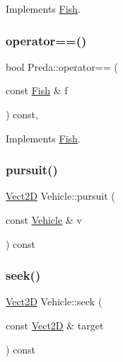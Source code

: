 Implements \hyperlink{classFish_aa739aa5c06ff6054b051047bccd3bf6f_aa739aa5c06ff6054b051047bccd3bf6f}{Fish}.

\mbox{\label{classPreda_a38ba49e7ab329e8ebbf23f242d3dd084_a38ba49e7ab329e8ebbf23f242d3dd084}} 
\subsubsection{\texorpdfstring{operator==()}{operator==()}}
{\footnotesize\ttfamily bool Preda\+::operator== (\begin{DoxyParamCaption}\item[{const \hyperlink{classFish}{Fish} \&}]{f }\end{DoxyParamCaption}) const\hspace{0.3cm}{\ttfamily [override]}, {\ttfamily [virtual]}}



Implements \hyperlink{classFish_a3abf96fe9cda276a4b3827464e2b0519_a3abf96fe9cda276a4b3827464e2b0519}{Fish}.

\mbox{\label{classVehicle_a9dd4f4a06b4abd3324d317c27bb867d2_a9dd4f4a06b4abd3324d317c27bb867d2}} 
\subsubsection{\texorpdfstring{pursuit()}{pursuit()}}
{\footnotesize\ttfamily \hyperlink{classVect2D}{Vect2D} Vehicle\+::pursuit (\begin{DoxyParamCaption}\item[{const \hyperlink{classVehicle}{Vehicle} \&}]{v }\end{DoxyParamCaption}) const\hspace{0.3cm}{\ttfamily [inherited]}}

\mbox{\label{classVehicle_a86c0b5ddcf64443bc090657cd29832bf_a86c0b5ddcf64443bc090657cd29832bf}} 
\subsubsection{\texorpdfstring{seek()}{seek()}}
{\footnotesize\ttfamily \hyperlink{classVect2D}{Vect2D} Vehicle\+::seek (\begin{DoxyParamCaption}\item[{const \hyperlink{classVect2D}{Vect2D} \&}]{target }\end{DoxyParamCaption}) const\hspace{0.3cm}{\ttfamily [inherited]}}

